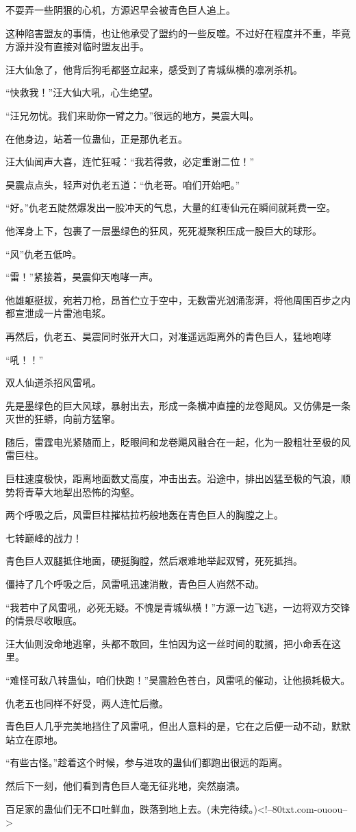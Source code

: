 \begin{this_body}
不耍弄一些阴狠的心机，方源迟早会被青色巨人追上。

这种陷害盟友的事情，也让他承受了盟约的一些反噬。不过好在程度并不重，毕竟方源并没有直接对临时盟友出手。

汪大仙急了，他背后狗毛都竖立起来，感受到了青城纵横的凛冽杀机。

“快救我！”汪大仙大吼，心生绝望。

“汪兄勿忧。我们来助你一臂之力。”很远的地方，昊震大叫。

在他身边，站着一位蛊仙，正是那仇老五。

汪大仙闻声大喜，连忙狂喊：“我若得救，必定重谢二位！”

昊震点点头，轻声对仇老五道：“仇老哥。咱们开始吧。”

“好。”仇老五陡然爆发出一股冲天的气息，大量的红枣仙元在瞬间就耗费一空。

他浑身上下，包裹了一层墨绿色的狂风，死死凝聚积压成一股巨大的球形。

“风”仇老五低吟。

“雷！”紧接着，昊震仰天咆哮一声。

他雄躯挺拔，宛若刀枪，昂首伫立于空中，无数雷光汹涌澎湃，将他周围百步之内都宣泄成一片雷池电浆。

再然后，仇老五、昊震同时张开大口，对准遥远距离外的青色巨人，猛地咆哮

“吼！！”

双人仙道杀招风雷吼。

先是墨绿色的巨大风球，暴射出去，形成一条横冲直撞的龙卷飓风。又仿佛是一条灭世的狂蟒，向前方猛窜。

随后，雷霆电光紧随而上，眨眼间和龙卷飓风融合在一起，化为一股粗壮至极的风雷巨柱。

巨柱速度极快，距离地面数丈高度，冲击出去。沿途中，排出凶猛至极的气浪，顺势将青草大地犁出恐怖的沟壑。

两个呼吸之后，风雷巨柱摧枯拉朽般地轰在青色巨人的胸膛之上。

七转巅峰的战力！

青色巨人双腿抵住地面，硬挺胸膛，然后艰难地举起双臂，死死抵挡。

僵持了几个呼吸之后，风雷吼迅速消散，青色巨人岿然不动。

“我若中了风雷吼，必死无疑。不愧是青城纵横！”方源一边飞逃，一边将双方交锋的情景尽收眼底。

汪大仙则没命地逃窜，头都不敢回，生怕因为这一丝时间的耽搁，把小命丢在这里。

“难怪可敌八转蛊仙，咱们快跑！”昊震脸色苍白，风雷吼的催动，让他损耗极大。

仇老五也同样不好受，两人连忙后撤。

青色巨人几乎完美地挡住了风雷吼，但出人意料的是，它在之后便一动不动，默默站立在原地。

“有些古怪。”趁着这个时候，参与进攻的蛊仙们都跑出很远的距离。

然后下一刻，他们看到青色巨人毫无征兆地，突然崩溃。

百足家的蛊仙们无不口吐鲜血，跌落到地上去。(未完待续。)<!--80txt.com-ouoou-->

\end{this_body}


